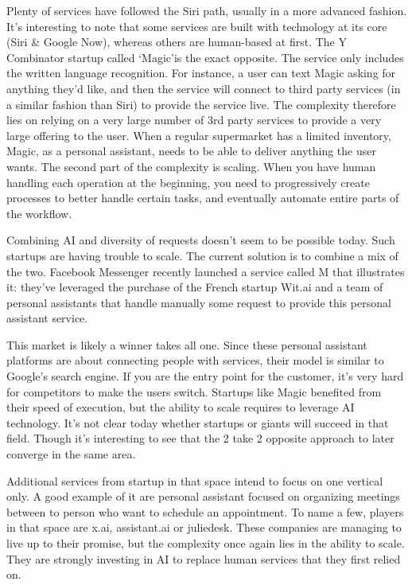 \documentclass[12pt]{article}
\begin{document}
Plenty of services have followed the Siri path, usually in a more advanced
fashion. It's interesting to note that some services are built with technology
at its core (Siri \& Google Now), whereas others are human-based at first. The Y
Combinator startup called \lq Magic\rq  is the exact opposite. The service only
includes the written language recognition. For instance, a user can text Magic
asking for anything they'd like, and then the service will connect to third
party services (in a similar fashion than Siri) to provide the service live. The
complexity therefore lies on relying on a very large number of 3rd party
services to provide a very large offering to the user. When a regular supermarket
has a limited inventory, Magic, as a personal assistant, needs to be able to
deliver anything the user wants. The second part of the complexity is scaling.
When you have human handling each operation at the beginning, you need to
progressively create processes to better handle certain tasks, and eventually
automate entire parts of the workflow.

Combining AI and diversity of requests doesn't seem to be possible today. Such
startups are having trouble to scale. The current solution is to combine a mix
of the two. Facebook Messenger recently launched a service called M that
illustrates it: they've leveraged the purchase of the French startup Wit.ai and
a team of personal assistants that handle manually some request to provide this
personal assistant service.

This market is likely a winner takes all one. Since these personal assistant
platforms are about connecting people with services, their model is similar to
Google's search engine. If you are the entry point for the customer, it's very
hard for competitors to make the users switch. Startups like Magic benefited
from their speed of execution, but the ability to scale requires to leverage AI
technology. It's not clear today whether startups or giants will succeed in that
field. Though it's interesting to see that the 2 take 2 opposite approach to
later converge in the same area.

Additional services from startup in that space intend to focus on one vertical
only. A good example of it are personal assistant focused on organizing meetings
between to person who want to schedule an appointment. To name a few, players in
that space are x.ai, assistant.ai or juliedesk. These companies are managing to
live up to their promise, but the complexity once again lies in the ability to
scale. They are strongly investing in AI to replace human services that they
first relied on.
\end{document}
